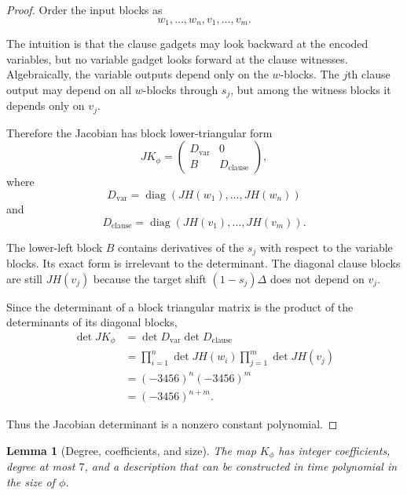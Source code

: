 \documentclass[11pt]{article}
\newtheorem{lemma}[theorem]{Lemma}
\begin{document}
\begin{proof}

Order the input blocks as
\[
w_1,\dots,w_n,v_1,\dots,v_m.
\]

The intuition is that the clause gadgets may look backward at the encoded
variables, but no variable gadget looks forward at the clause witnesses.
Algebraically, the variable outputs depend only on the $w$-blocks.  The
$j$th clause output may depend on all $w$-blocks through $s_j$, but among the
witness blocks it depends only on $v_j$.

Therefore the Jacobian has block lower-triangular form
\[
JK_\phi=
\begin{pmatrix}
D_{\mathrm{var}} & 0
\\
B & D_{\mathrm{clause}}
\end{pmatrix},
\]
where
\[
D_{\mathrm{var}}=\operatorname{diag}
\left(
JH(w_1),\dots,JH(w_n)
\right)
\]
and
\[
D_{\mathrm{clause}}=\operatorname{diag}
\left(
JH(v_1),\dots,JH(v_m)
\right).
\]

The lower-left block $B$ contains derivatives of the $s_j$ with respect to
the variable blocks.  Its exact form is irrelevant to the determinant.  The
diagonal clause blocks are still $JH(v_j)$ because the target shift
$(1-s_j)\Delta$ does not depend on $v_j$.

Since the determinant of a block triangular matrix is the product of the
determinants of its diagonal blocks,
\begin{align}
\det JK_\phi
&=
\det D_{\mathrm{var}}
\det D_{\mathrm{clause}}
\\
&=
\prod_{i=1}^{n}\det JH(w_i)
\prod_{j=1}^{m}\det JH(v_j)
\\
&=
(-3456)^n(-3456)^m
\\
&=
(-3456)^{n+m}.
\end{align}

Thus the Jacobian determinant is a nonzero constant polynomial.
\end{proof}

\begin{lemma}[Degree, coefficients, and size]
The map $K_\phi$ has integer coefficients, degree at most $7$, and a
description that can be constructed in time polynomial in the size of
$\phi$.
\end{lemma}
\end{document}
